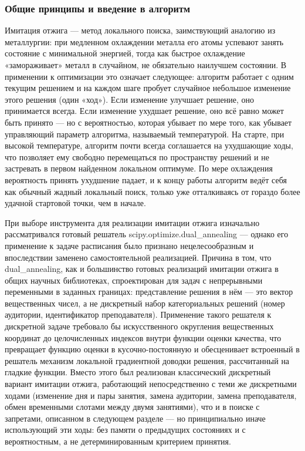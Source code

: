  
\subsubsection{ Общие принципы и введение в алгоритм}

Имитация отжига — метод локального поиска, заимствующий аналогию из металлургии: при медленном охлаждении металла его атомы успевают занять состояние с минимальной энергией, тогда как быстрое охлаждение «замораживает» металл в случайном, не обязательно наилучшем состоянии. В применении к оптимизации это означает следующее: алгоритм работает с одним текущим решением и на каждом шаге пробует случайное небольшое изменение этого решения (один «ход»). Если изменение улучшает решение, оно принимается всегда. Если изменение ухудшает решение, оно всё равно может быть принято — но с вероятностью, которая убывает по мере того, как убывает управляющий параметр алгоритма, называемый температурой. На старте, при высокой температуре, алгоритм почти всегда соглашается на ухудшающие ходы, что позволяет ему свободно перемещаться по пространству решений и не застревать в первом найденном локальном оптимуме. По мере охлаждения вероятность принять ухудшение падает, и к концу работы алгоритм ведёт себя как обычный жадный локальный поиск, только уже отталкиваясь от гораздо более удачной стартовой точки, чем в начале.

При выборе инструмента для реализации имитации отжига изначально рассматривался готовый решатель scipy.optimize.dual_annealing — однако его применение к задаче расписания было признано нецелесообразным и впоследствии заменено самостоятельной реализацией. Причина в том, что dual_annealing, как и большинство готовых реализаций имитации отжига в общих научных библиотеках, спроектирован для задач с непрерывными переменными в заданных границах: представление решения в нём — это вектор вещественных чисел, а не дискретный набор категориальных решений (номер аудитории, идентификатор преподавателя). Применение такого решателя к дискретной задаче требовало бы искусственного округления вещественных координат до целочисленных индексов внутри функции оценки качества, что превращает функцию оценки в кусочно-постоянную и обесценивает встроенный в решатель механизм локальной градиентной доводки решения, рассчитанный на гладкие функции. Вместо этого был реализован классический дискретный вариант имитации отжига, работающий непосредственно с теми же дискретными ходами (изменение дня и пары занятия, замена аудитории, замена преподавателя, обмен временными слотами между двумя занятиями), что и в поиске с запретами, описанном в следующем разделе — но принципиально иначе использующий эти ходы: без памяти о предыдущих состояниях и с вероятностным, а не детерминированным критерием принятия.

